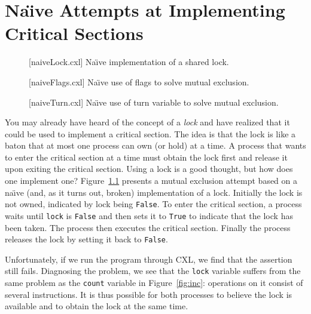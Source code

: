 \documentclass{report}
\newenvironment{code}{
\tcolorbox
}{
\endtcolorbox
}
\begin{document}
\chapter{Na\"{\i}ve Attempts at Implementing Critical Sections}

\begin{figure}
\begin{code}
\end{code}
\caption{[naiveLock.cxl] Na\"{\i}ve implementation of a shared lock.}
\label{fig:uplock}
\end{figure}

\begin{figure}
\begin{code}
\end{code}
\caption{[naiveFlags.cxl] Na\"{\i}ve use of flags to solve mutual exclusion.}
\label{fig:upflags}
\end{figure}

\begin{figure}
\begin{code}
\end{code}
\caption{[naiveTurn.cxl] Na\"{\i}ve use of turn variable to solve mutual exclusion.}
\label{fig:upturn}
\end{figure}

You may already have heard of the concept of a \emph{lock} and have realized that
it could be used to implement a critical section.
The idea is that the lock is like a baton that at most one process can own
(or hold) at a time.
A process that wants to enter the critical section at a time must obtain the
lock first and release it upon exiting the critical section.
Using a lock is a good thought, but how does one implement one?
Figure~\ref{fig:uplock} presents a mutual exclusion attempt based on a
na\"{\i}ve (and, as it turns out, broken) implementation of a lock.
Initially the lock is not owned, indicated by lock being \texttt{False}.
To enter the critical section, a process waits until \texttt{lock} is \texttt{False}
and then sets it to \texttt{True} to indicate that the lock has been taken.
The process then executes the critical section.  Finally the process
releases the lock by setting it back to \texttt{False}.

Unfortunately, if we run the program through CXL, we find that the assertion still
fails.  Diagnosing the problem, we see that the \texttt{lock} variable
suffers from the same problem as the \texttt{count} variable
in Figure~\ref{fig:inc}: operations
on it consist of several instructions.  It is thus possible
for both processes to believe the lock is available and to obtain the lock
at the same time.
\end{document}
